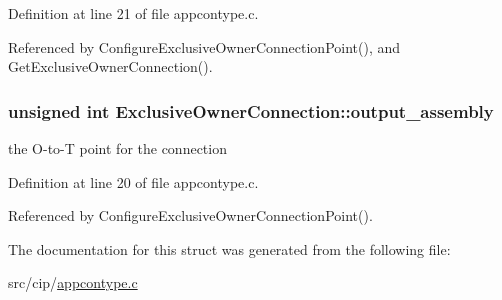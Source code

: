 \-Definition at line 21 of file appcontype.\-c.



\-Referenced by \-Configure\-Exclusive\-Owner\-Connection\-Point(), and \-Get\-Exclusive\-Owner\-Connection().

\hypertarget{structExclusiveOwnerConnection_af87afe8d455fcff291043a1a3b1c9f64}{
\subsubsection[{output\-\_\-assembly}]{\setlength{\rightskip}{0pt plus 5cm}unsigned int {\bf \-Exclusive\-Owner\-Connection\-::output\-\_\-assembly}}}\label{d7/d95/structExclusiveOwnerConnection_af87afe8d455fcff291043a1a3b1c9f64}
the \-O-\/to-\/\-T point for the connection 

\-Definition at line 20 of file appcontype.\-c.



\-Referenced by \-Configure\-Exclusive\-Owner\-Connection\-Point().



\-The documentation for this struct was generated from the following file\-:\begin{DoxyCompactItemize}
\item 
src/cip/\hyperlink{appcontype_8c}{appcontype.\-c}\end{DoxyCompactItemize}
